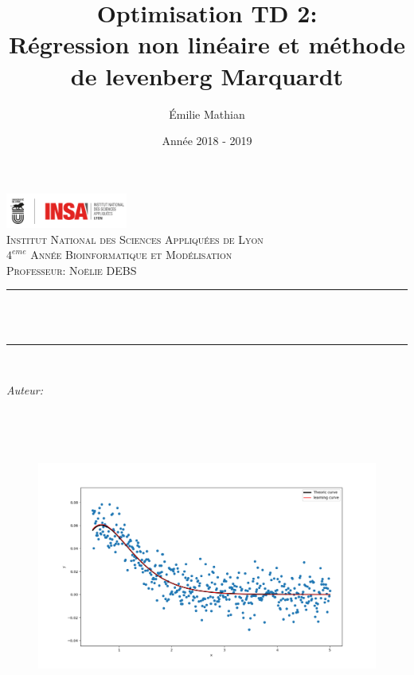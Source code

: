 \documentclass[12pt]{article}
\title{\color{brick} Optimisation TD 2:\\
\LARGE{Régression non linéaire et méthode de levenberg Marquardt}}								%
\author{Émilie Mathian}								%
\date{Année 2018 - 2019}											%
\makeatletter
\let\thetitle\@title
\let\theauthor\@author
\let\thedate\@date
\makeatother
\begin{document}

\begin{titlepage}
	\centering
    \vspace*{0.5 cm}
    \vspace{-3.5cm}
    \includegraphics[width = 4cm]{logo.png}\\	%
    \textsc{\LARGE Institut National des Sciences Appliquées de Lyon}\\[2.0 cm]	%
	\textsc{\Large $4^{eme}$ Année Bioinformatique et Modélisation}\\[0.5 cm]				%
	\textsc{\large Professeur: Noëlie DEBS }\\[0.5 cm]				%
	\rule{\linewidth}{0.2 mm} \\[0.4 cm]
	{ \huge \bfseries \thetitle}\\
	\rule{\linewidth}{0.2 mm} \\[1.5 cm]
	
	\begin{minipage}{0.4\textwidth}
		\begin{flushleft} \large
			\emph{Auteur:}
			\theauthor
			\end{flushleft}
			\end{minipage}~
			\begin{minipage}{0.4\textwidth}	
	\end{minipage}\\[2 cm]
    \vspace{-1.8cm}
	 \begin{figure}[H]
	\begin{center}
	\includegraphics[width=0.9 \textwidth]{Figure_1.png}
\end{center}
\end{figure}

	{\large \thedate}\\[1 cm]
    
	\vfill

 

\end{titlepage}
\pagebreak
\end{document}
